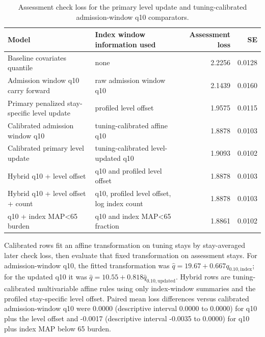 \begin{table}[!htbp]
\caption{Assessment check loss for the primary level update and tuning-calibrated admission-window q10 comparators.}
\label{tab:calibrated_comparator}
\centering
\begin{tabular}{llrr}
\hline
Model & Index window information used & Assessment loss & SE\\
\hline
Baseline covariates quantile & none & 2.2256 & 0.0128\\
Admission window q10 carry forward & raw admission window q10 & 2.1439 & 0.0160\\
Primary penalized stay-specific level update & profiled level offset & 1.9575 & 0.0115\\
Calibrated admission window q10 & tuning-calibrated affine q10 & 1.8878 & 0.0103\\
Calibrated primary level update & tuning-calibrated level-updated q10 & 1.9093 & 0.0102\\
Hybrid q10 + level offset & q10 and profiled level offset & 1.8878 & 0.0103\\
Hybrid q10 + level offset + count & q10, profiled level offset, log index count & 1.8878 & 0.0103\\
q10 + index MAP<65 burden & q10 and index MAP<65 fraction & 1.8861 & 0.0102\\
\hline
\end{tabular}
\par\smallskip
\footnotesize{Calibrated rows fit an affine transformation on tuning stays by stay-averaged later check loss, then evaluate that fixed transformation on assessment stays. For admission-window q10, the fitted transformation was $\widehat q= 19.67 + 0.667 q_{0.10,\mathrm{index}}$; for the updated q10 it was $\widehat q= 10.55 + 0.818 \widehat q_{0.10,\mathrm{updated}}$.
Hybrid rows are tuning-calibrated multivariable affine rules using only index-window summaries and the profiled stay-specific level offset.
Paired mean loss differences versus calibrated admission-window q10 were 0.0000 (descriptive interval 0.0000 to 0.0000) for q10 plus the level offset and -0.0017 (descriptive interval -0.0035 to 0.0000) for q10 plus index MAP below 65 burden.
}
\end{table}
